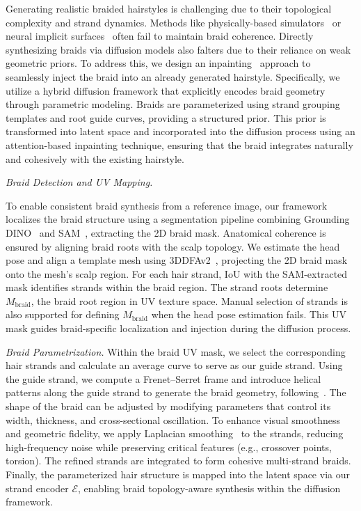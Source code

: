 Generating realistic braided hairstyles is challenging due to their topological complexity and strand dynamics. Methods like physically-based simulators~\cite{PBSimulator, HairAnimGPU} or neural implicit surfaces~\cite{wang2021neus} often fail to maintain braid coherence.
%
Directly synthesizing braids via diffusion models also falters due to their reliance on weak geometric priors. 
To address this, we design an inpainting~\cite{lugmayr2022repaint} approach to seamlessly inject the braid into an already generated hairstyle. Specifically, we utilize a hybrid diffusion framework that explicitly encodes braid geometry through parametric modeling. Braids are parameterized using strand grouping templates and root guide curves, providing a structured prior. This prior is transformed into latent space and incorporated into the diffusion process using an attention-based inpainting technique, ensuring that the braid integrates naturally and cohesively with the existing hairstyle.

\vspace{4pt}
\noindent \textit{Braid Detection and UV Mapping.} 

To enable consistent braid synthesis from a reference image, our framework localizes the braid structure using a segmentation pipeline combining Grounding DINO~\cite{liu2025grounding} and SAM~\cite{kirillov2023segment}, extracting the 2D braid mask. Anatomical coherence is ensured by aligning braid roots with the scalp topology. We estimate the head pose and align a template mesh using 3DDFAv2~\cite{guo2020towards}, projecting the 2D braid mask onto the mesh’s scalp region. For each hair strand, IoU with the SAM-extracted mask identifies strands within the braid region. The strand roots determine $M_{\text{braid}}$, the braid root region in UV texture space. Manual selection of strands is also supported for defining $M_{\text{braid}}$ when the head pose estimation fails. This UV mask guides braid-specific localization and injection during the diffusion process.

\vspace{4pt}
\noindent \textit{Braid Parametrization.}
Within the braid UV mask, we select the corresponding hair strands and calculate an average curve to serve as our guide strand. Using the guide strand, we compute a Frenet--Serret frame and introduce helical patterns along the guide strand to generate the braid geometry, following~\cite{hu2014capturing}.
The shape of the braid can be adjusted by modifying parameters that control its width, thickness, and cross-sectional oscillation. 
To enhance visual smoothness and geometric fidelity, we apply Laplacian smoothing~\cite{Crane:2011:STD} to the strands, reducing high-frequency noise while preserving critical features (e.g., crossover points, torsion). The refined strands are integrated to form cohesive multi-strand braids. Finally, the parameterized hair structure is mapped into the latent space via our strand encoder $\mathcal{E}$, enabling braid topology-aware synthesis within the diffusion framework.  




